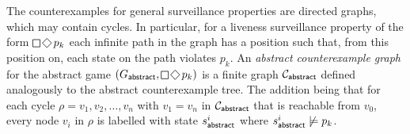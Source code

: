 The counterexamples for general surveillance properties are directed graphs, which may contain cycles. In particular, for a liveness surveillance property of the form $\LTLglobally\LTLfinally p_k$ each infinite path in the graph has a position such that, from this position on, each state on the path violates $p_k$. An \emph{abstract counterexample graph} for the abstract game $(G_\abstr,\LTLglobally\LTLfinally p_k)$ is a finite graph $\mathcal{C}_{\mathsf{abstract}}$ defined analogously to the abstract counterexample tree. The addition being that for each cycle $\rho = v_1,v_2,\ldots,v_n$ with $v_1 = v_n$ in $\mathcal{C}_{\mathsf{abstract}}$ that is reachable from $v_0$, every node $v_i$ in $\rho$ is labelled with state $s_{\mathsf{abstract}}^i$ where $s_{\mathsf{abstract}}^i \not\models p_k$.

